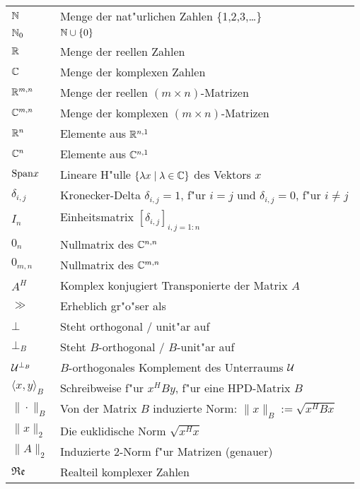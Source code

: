 \begin{tabular}{ll}
$\mathbb{N}$ & Menge der nat"urlichen Zahlen \{1,2,3,\ldots\}\\
$\mathbb{N}_{0}$ & $\mathbb{N}\cup\{0\}$\\
$\mathbb{R}$ & Menge der reellen Zahlen\\
$\mathbb{C}$ & Menge der komplexen Zahlen\\
$\mathbb{R}^{m,n}$ & Menge der reellen $(m\times n)$-Matrizen\\
$\mathbb{C}^{m,n}$ & Menge der komplexen $(m\times n)$-Matrizen\\
$\mathbb{R}^n$ & Elemente aus $\mathbb{R}^{n,1}$\\
$\mathbb{C}^n$ & Elemente aus $\mathbb{C}^{n,1}$\\
$\text{Span}{x}$ & Lineare H"ulle $\{\lambda x \mid \lambda\in\mathbb{C}\}$ des Vektors $x$\\
$\delta_{i,j}$ & Kronecker-Delta $\delta_{i,j} = 1$, f"ur $i=j$ und $\delta_{i,j} = 0$, f"ur $i\neq j$\\
$I_n$ & Einheitsmatrix $[\delta_{i,j}]_{i,j=1:n}$\\
$0_n$ & Nullmatrix des $\mathbb{C}^{n,n}$\\
$0_{m,n}$ & Nullmatrix des $\mathbb{C}^{m,n}$\\
$A^H$ & Komplex konjugiert Transponierte der Matrix $A$\\
$\gg$ & Erheblich gr"o"ser als\\
$\bot$ & Steht orthogonal / unit"ar auf\\
$\bot_B$ & Steht $B$-orthogonal / $B$-unit"ar auf\\
$\mathcal{U}^{\bot_B}$ & $B$-orthogonales Komplement des Unterraums $\mathcal{U}$\\
$\langle x,y\rangle_B$ & Schreibweise f"ur $x^H B y$, f"ur eine HPD-Matrix $B$\\
$\|\cdot\|_B$ & Von der Matrix $B$ induzierte Norm: $\|x\|_B := \sqrt{x^H B x}$\\
$\|x\|_2$ & Die euklidische Norm $\sqrt{x^H x}$\\
$\|A\|_2$ & Induzierte $2$-Norm f"ur Matrizen (genauer)\\
$\mathfrak{Re}$ & Realteil komplexer Zahlen
\end{tabular}
